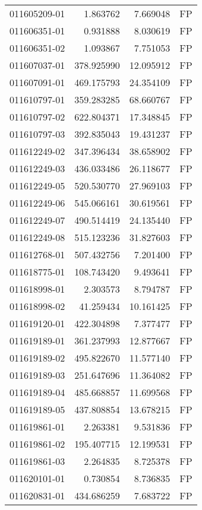 \begin{tabular}{lrrl}
011605209-01 &    1.863762 &     7.669048 &   FP \\
011606351-01 &    0.931888 &     8.030619 &   FP \\
011606351-02 &    1.093867 &     7.751053 &   FP \\
011607037-01 &  378.925990 &    12.095912 &   FP \\
011607091-01 &  469.175793 &    24.354109 &   FP \\
011610797-01 &  359.283285 &    68.660767 &   FP \\
011610797-02 &  622.804371 &    17.348845 &   FP \\
011610797-03 &  392.835043 &    19.431237 &   FP \\
011612249-02 &  347.396434 &    38.658902 &   FP \\
011612249-03 &  436.033486 &    26.118677 &   FP \\
011612249-05 &  520.530770 &    27.969103 &   FP \\
011612249-06 &  545.066161 &    30.619561 &   FP \\
011612249-07 &  490.514419 &    24.135440 &   FP \\
011612249-08 &  515.123236 &    31.827603 &   FP \\
011612768-01 &  507.432756 &     7.201400 &   FP \\
011618775-01 &  108.743420 &     9.493641 &   FP \\
011618998-01 &    2.303573 &     8.794787 &   FP \\
011618998-02 &   41.259434 &    10.161425 &   FP \\
011619120-01 &  422.304898 &     7.377477 &   FP \\
011619189-01 &  361.237993 &    12.877667 &   FP \\
011619189-02 &  495.822670 &    11.577140 &   FP \\
011619189-03 &  251.647696 &    11.364082 &   FP \\
011619189-04 &  485.668857 &    11.699568 &   FP \\
011619189-05 &  437.808854 &    13.678215 &   FP \\
011619861-01 &    2.263381 &     9.531836 &   FP \\
011619861-02 &  195.407715 &    12.199531 &   FP \\
011619861-03 &    2.264835 &     8.725378 &   FP \\
011620101-01 &    0.730854 &     8.736835 &   FP \\
011620831-01 &  434.686259 &     7.683722 &   FP \\

\end{tabular}
